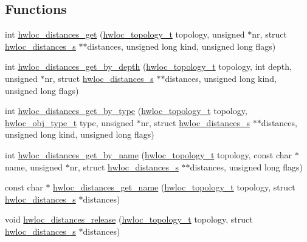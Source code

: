 \subsection*{Functions}
\begin{DoxyCompactItemize}
\item 
int \hyperlink{a00208_ga613e6b2a5d0f06626ee8d0c12fa46691}{hwloc\+\_\+distances\+\_\+get} (\hyperlink{a00186_ga9d1e76ee15a7dee158b786c30b6a6e38}{hwloc\+\_\+topology\+\_\+t} topology, unsigned $\ast$nr, struct \hyperlink{a00310}{hwloc\+\_\+distances\+\_\+s} $\ast$$\ast$distances, unsigned long kind, unsigned long flags)
\item 
int \hyperlink{a00208_ga5d1d35eccfcc2ebcef71a10972ce9b03}{hwloc\+\_\+distances\+\_\+get\+\_\+by\+\_\+depth} (\hyperlink{a00186_ga9d1e76ee15a7dee158b786c30b6a6e38}{hwloc\+\_\+topology\+\_\+t} topology, int depth, unsigned $\ast$nr, struct \hyperlink{a00310}{hwloc\+\_\+distances\+\_\+s} $\ast$$\ast$distances, unsigned long kind, unsigned long flags)
\item 
int \hyperlink{a00208_gaaa6bfbc20072a4f4de132eec859067f6}{hwloc\+\_\+distances\+\_\+get\+\_\+by\+\_\+type} (\hyperlink{a00186_ga9d1e76ee15a7dee158b786c30b6a6e38}{hwloc\+\_\+topology\+\_\+t} topology, \hyperlink{a00184_gacd37bb612667dc437d66bfb175a8dc55}{hwloc\+\_\+obj\+\_\+type\+\_\+t} type, unsigned $\ast$nr, struct \hyperlink{a00310}{hwloc\+\_\+distances\+\_\+s} $\ast$$\ast$distances, unsigned long kind, unsigned long flags)
\item 
int \hyperlink{a00208_gaa457f35b8745ca41ec17797c0d7b20f0}{hwloc\+\_\+distances\+\_\+get\+\_\+by\+\_\+name} (\hyperlink{a00186_ga9d1e76ee15a7dee158b786c30b6a6e38}{hwloc\+\_\+topology\+\_\+t} topology, const char $\ast$name, unsigned $\ast$nr, struct \hyperlink{a00310}{hwloc\+\_\+distances\+\_\+s} $\ast$$\ast$distances, unsigned long flags)
\item 
const char $\ast$ \hyperlink{a00208_gaa6f9697028c589cef0458edef5fe273f}{hwloc\+\_\+distances\+\_\+get\+\_\+name} (\hyperlink{a00186_ga9d1e76ee15a7dee158b786c30b6a6e38}{hwloc\+\_\+topology\+\_\+t} topology, struct \hyperlink{a00310}{hwloc\+\_\+distances\+\_\+s} $\ast$distances)
\item 
void \hyperlink{a00208_ga1dd78c1f9acd54f26aba0e284e97e51d}{hwloc\+\_\+distances\+\_\+release} (\hyperlink{a00186_ga9d1e76ee15a7dee158b786c30b6a6e38}{hwloc\+\_\+topology\+\_\+t} topology, struct \hyperlink{a00310}{hwloc\+\_\+distances\+\_\+s} $\ast$distances)
\end{DoxyCompactItemize}


